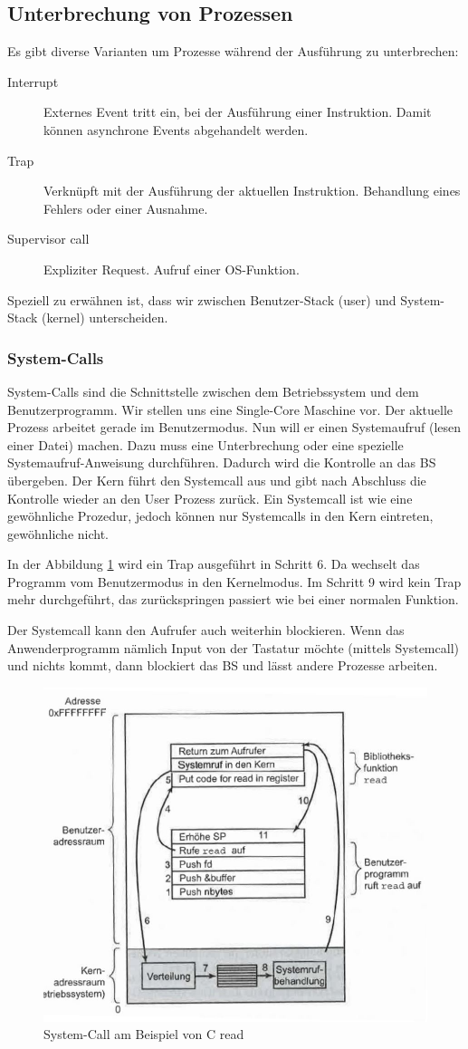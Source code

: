 \subsection{Unterbrechung von Prozessen}
Es gibt diverse Varianten um Prozesse während der Ausführung zu unterbrechen:
\begin{description}
	\item[Interrupt] Externes Event tritt ein, bei der Ausführung einer Instruktion. Damit können asynchrone Events abgehandelt werden.
	\item[Trap] Verknüpft mit der Ausführung der aktuellen Instruktion. Behandlung eines Fehlers oder einer Ausnahme.
	\item[Supervisor call] Expliziter Request. Aufruf einer OS-Funktion.
\end{description}
Speziell zu erwähnen ist, dass wir zwischen Benutzer-Stack (user) und System-Stack (kernel) unterscheiden.

\subsubsection{System-Calls}
System-Calls sind die Schnittstelle zwischen dem Betriebssystem und dem Benutzerprogramm. Wir stellen uns eine Single-Core Maschine vor. Der aktuelle Prozess arbeitet gerade im Benutzermodus. Nun will er einen Systemaufruf (lesen einer Datei) machen. Dazu muss eine Unterbrechung oder eine spezielle Systemaufruf-Anweisung durchführen. Dadurch wird die Kontrolle an das BS übergeben. Der Kern führt den Systemcall aus und gibt nach Abschluss die Kontrolle wieder an den User Prozess zurück. Ein Systemcall ist wie eine gewöhnliche Prozedur, jedoch können nur Systemcalls in den Kern eintreten, gewöhnliche nicht.

In der Abbildung \ref{fig:system-software-ablauf-c-read} wird ein Trap ausgeführt in Schritt 6. Da wechselt das Programm vom Benutzermodus in den Kernelmodus. Im Schritt 9 wird kein Trap mehr durchgeführt, das zurückspringen passiert wie bei einer normalen Funktion.

Der Systemcall kann den Aufrufer auch weiterhin blockieren. Wenn das Anwenderprogramm nämlich Input von der Tastatur möchte (mittels Systemcall) und nichts kommt, dann blockiert das BS und lässt andere Prozesse arbeiten.

\begin{figure}[h!]
	\centering
	\includegraphics[width=0.6\linewidth]{fig/system-software-ablauf-c-read}
	\caption{System-Call am Beispiel von C read}
	\label{fig:system-software-ablauf-c-read}
\end{figure}

